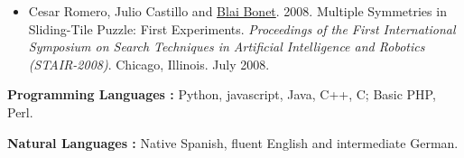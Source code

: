 \documentclass[10pt]{article}
\newcommand{\vitem}{\vspace*{-.4pc}\item}
\begin{document}
\begin{itemize}
\vitem Cesar Romero, Julio Castillo and
\href{http://www.ldc.usb.ve/~bonet}{Blai Bonet}. 2008. Multiple
Symmetries in Sliding-Tile Puzzle: First Experiments. \emph{Proceedings of the First International Symposium on Search Techniques in Artificial Intelligence and Robotics (STAIR-2008)}. Chicago, Illinois. July 2008.
\end{itemize}

\flushleft\textbf{Programming Languages :} Python, javascript, Java,
C++, C; Basic PHP, Perl.

\noindent\textbf{Natural Languages :} Native Spanish, fluent English
and intermediate German.




\end{document}
